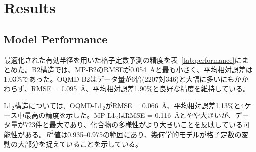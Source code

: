 \documentclass[a4paper,10pt,5p]{elsarticle}
\begin{document}
\section{Results}

\subsection{Model Performance}

最適化された有効半径を用いた格子定数予測の精度を表~\ref{tab:performance}にまとめた。B2構造では、MP-B2のRMSEが0.054~\AA と最も小さく、平均相対誤差は1.03\%であった。OQMD-B2はデータ量が6倍(2207対346)と大幅に多いにもかかわらず、RMSE = 0.095~\AA、平均相対誤差1.90\%と良好な精度を維持している。

L1$_2$構造については、OQMD-L1$_2$がRMSE = 0.066~\AA、平均相対誤差1.13\%と4ケース中最高の精度を示した。MP-L1$_2$はRMSE = 0.116~\AA とやや大きいが、データ量が723件と最大であり、化合物の多様性がより大きいことを反映している可能性がある。$R^2$値は0.935--0.975の範囲にあり、幾何学的モデルが格子定数の変動の大部分を捉えていることを示している。



\begin{table}[htbp]
\small
    \centering
    \caption{Lattice constant prediction accuracy using optimized effective radii. RMSE is the root-mean-square error between observed and predicted lattice constants, MAE is the mean absolute error, and $R^2$ is the coefficient of determination. The mean and maximum relative errors are also shown.}
    \label{tab:performance}
\end{table}
\end{document}
